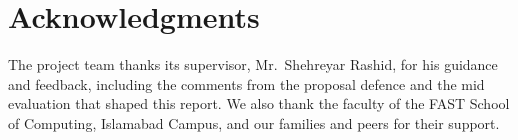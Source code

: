 \chapter*{Acknowledgments}
The project team thanks its supervisor, Mr.\ Shehreyar Rashid, for his guidance and feedback, including the comments from the proposal defence and the mid evaluation that shaped this report. We also thank the faculty of the FAST School of Computing, Islamabad Campus, and our families and peers for their support.
